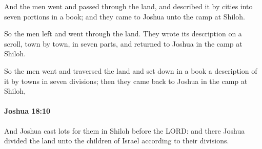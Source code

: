 			\begin{versebox}
					\item[BHS] 
					\item[ASV] And the men went and passed through the land, and described it by cities into seven portions in a book; and they came to Joshua unto the camp at Shiloh.
					\item[NIV] So the men left and went through the land. They wrote its description on a scroll, town by town, in seven parts, and returned to Joshua in the camp at Shiloh.
					\item[NRSV] So the men went and traversed the land and set down in a book a description of it by towns in seven divisions; then they came back to Joshua in the camp at Shiloh,
			\end{versebox}

		\paragraph{Joshua 18:10} %
			\label{JOSHUA-18-10}

			And Joshua cast lots for them in Shiloh before the LORD: and there Joshua divided the land unto the children of Israel according to their divisions.

